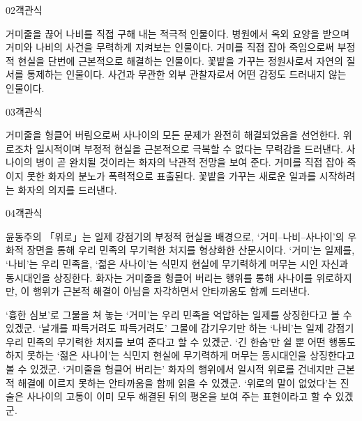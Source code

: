 \documentclass[fs85,seriesWit]{korfarm-base}
\begin{document}
\begin{kfQBlock}{02}{객관식}
\begin{kfChoices}
\kfChoice 거미줄을 끊어 나비를 직접 구해 내는 적극적 인물이다.
\kfChoice 병원에서 옥외 요양을 받으며 거미와 나비의 사건을 무력하게 지켜보는 인물이다.
\kfChoice 거미를 직접 잡아 죽임으로써 부정적 현실을 단번에 근본적으로 해결하는 인물이다.
\kfChoice 꽃밭을 가꾸는 정원사로서 자연의 질서를 통제하는 인물이다.
\kfChoice 사건과 무관한 외부 관찰자로서 어떤 감정도 드러내지 않는 인물이다.
\end{kfChoices}
\end{kfQBlock}

\begin{kfQBlock}{03}{객관식}
\begin{kfChoices}
\kfChoice 거미줄을 헝클어 버림으로써 사나이의 모든 문제가 완전히 해결되었음을 선언한다.
\kfChoice 위로조차 일시적이며 부정적 현실을 근본적으로 극복할 수 없다는 무력감을 드러낸다.
\kfChoice 사나이의 병이 곧 완치될 것이라는 화자의 낙관적 전망을 보여 준다.
\kfChoice 거미를 직접 잡아 죽이지 못한 화자의 분노가 폭력적으로 표출된다.
\kfChoice 꽃밭을 가꾸는 새로운 일과를 시작하려는 화자의 의지를 드러낸다.
\end{kfChoices}
\end{kfQBlock}

\begin{kfQBlock}{04}{객관식}
\begin{kfEvidence}윤동주의 「위로」는 일제 강점기의 부정적 현실을 배경으로, ‘거미–나비–사나이’의 우화적 장면을 통해 우리 민족의 무기력한 처지를 형상화한 산문시이다. ‘거미’는 일제를, ‘나비’는 우리 민족을, ‘젊은 사나이’는 식민지 현실에 무기력하게 머무는 시인 자신과 동시대인을 상징한다. 화자는 거미줄을 헝클어 버리는 행위를 통해 사나이를 위로하지만, 이 행위가 근본적 해결이 아님을 자각하면서 안타까움도 함께 드러낸다.\end{kfEvidence}
\begin{kfChoices}
\kfChoice ‘흉한 심보’로 그물을 쳐 놓는 ‘거미’는 우리 민족을 억압하는 일제를 상징한다고 볼 수 있겠군.
\kfChoice ‘날개를 파득거려도 파득거려도’ 그물에 감기우기만 하는 ‘나비’는 일제 강점기 우리 민족의 무기력한 처지를 보여 준다고 할 수 있겠군.
\kfChoice ‘긴 한숨’만 쉴 뿐 어떤 행동도 하지 못하는 ‘젊은 사나이’는 식민지 현실에 무기력하게 머무는 동시대인을 상징한다고 볼 수 있겠군.
\kfChoice ‘거미줄을 헝클어 버리는’ 화자의 행위에서 일시적 위로를 건네지만 근본적 해결에 이르지 못하는 안타까움을 함께 읽을 수 있겠군.
\kfChoice ‘위로의 말이 없었다’는 진술은 사나이의 고통이 이미 모두 해결된 뒤의 평온을 보여 주는 표현이라고 할 수 있겠군.
\end{kfChoices}
\end{kfQBlock}
\end{document}
